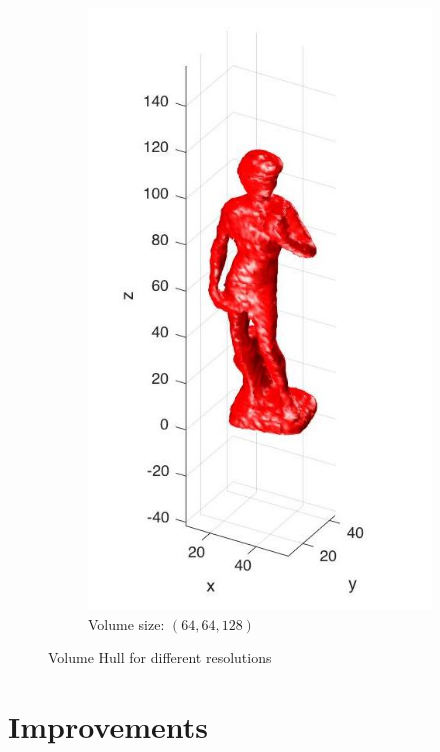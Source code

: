 \documentclass{ethz_report}
\begin{document}
\begin{figure}[H]
\begin{subfigure}[b]{.5\textwidth}
  \includegraphics[width=.8\linewidth]{images/visual_hull_high}
  \caption{Volume size: $(64, 64, 128)$}
\end{subfigure}
\caption{Volume Hull for different resolutions}
\label{fig:fun_mat}
\end{figure}


\section*{Improvements}
\end{document}

